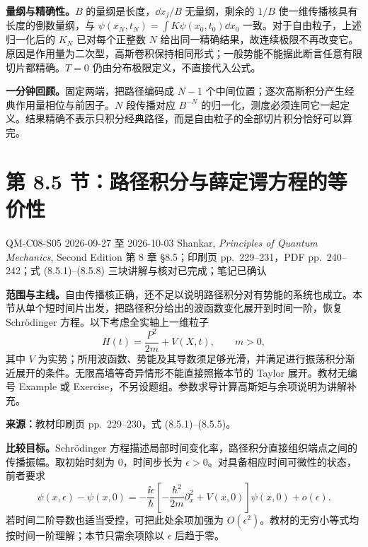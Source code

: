 \textbf{量纲与精确性。}$B$ 的量纲是长度，$\dd x_j/B$ 无量纲，剩余的 $1/B$ 使一维传播核具有长度的倒数量纲，与 $\psi(x_N,t_N)=\int K\psi(x_0,t_0)\dd x_0$ 一致。对于自由粒子，上述归一化后的 $K_N$ 已对每个正整数 $N$ 给出同一精确结果，故连续极限不再改变它。原因是作用量为二次型，高斯卷积保持相同形式；一般势能不能据此断言任意有限切片都精确。$T=0$ 仍由分布极限定义，不直接代入公式。

\textbf{一分钟回顾。}固定两端，把路径编码成 $N-1$ 个中间位置；逐次高斯积分产生经典作用量相位与前因子。$N$ 段传播对应 $B^{-N}$ 的归一化，测度必须连同它一起定义。结果精确不表示只积分经典路径，而是自由粒子的全部切片积分恰好可以算完。

\section{第 8.5 节：路径积分与薛定谔方程的等价性}
\label{section:QM-C08-S05}
\studymeta
  {QM-C08-S05}
  {2026-09-27 至 2026-10-03}
  {Shankar, \textit{Principles of Quantum Mechanics}, Second Edition}
  {第 8 章 \S 8.5；印刷页 pp.~229--231，PDF pp.~240--242；式 (8.5.1)--(8.5.8)}
  {三块讲解与核对已完成；笔记已确认}

\textbf{范围与主线。}自由传播核正确，还不足以说明路径积分对有势能的系统也成立。本节从单个短时间片出发，把路径积分给出的波函数变化展开到时间一阶，恢复 Schrödinger 方程。以下考虑全实轴上一维粒子
\begin{equation}
  H(t)=\frac{P^2}{2m}+V(X,t),\qquad m>0,
\end{equation}
其中 $V$ 为实势；所用波函数、势能及其导数须足够光滑，并满足进行振荡积分渐近展开的条件。无限高墙等奇异情形不能直接照搬本节的 Taylor 展开。教材无编号 Example 或 Exercise，不另设题组。参数求导计算高斯矩与余项说明为讲解补充。

\textbf{来源：}教材印刷页 pp.~229--230，式 (8.5.1)--(8.5.5)。

\textbf{比较目标。}Schrödinger 方程描述局部时间变化率，路径积分直接组织端点之间的传播振幅。取初始时刻为 $0$，时间步长为 $\epsilon>0$。对具备相应时间可微性的状态，前者要求
\begin{equation}
  \psi(x,\epsilon)-\psi(x,0)
  =-\frac{\ii\epsilon}{\hbar}
    \left[-\frac{\hbar^2}{2m}\partial_x^2+V(x,0)\right]
    \psi(x,0)+o(\epsilon).
  \label{eq:QM-C08-S05-target}
\end{equation}
若时间二阶导数也适当受控，可把此处余项加强为 $O(\epsilon^2)$。教材的无穷小等式均按时间一阶理解；本节只需余项除以 $\epsilon$ 后趋于零。

